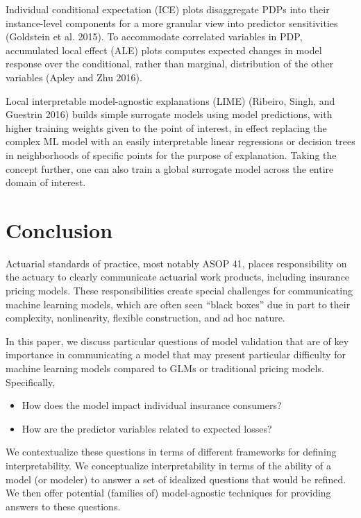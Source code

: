 \documentclass[preprint, 3p, twocolumn, letterpaper, 10pt]{elsarticle} %
\providecommand{\tightlist}{%
  \setlength{\itemsep}{0pt}\setlength{\parskip}{0pt}}
\begin{document}
Individual conditional expectation (ICE) plots disaggregate PDPs into their
instance-level components for a more granular view into predictor sensitivities
(Goldstein et al. 2015). To accommodate correlated variables in PDP, accumulated
local effect (ALE) plots computes expected changes in model response over the
conditional, rather than marginal, distribution of the other variables
(Apley and Zhu 2016).

Local interpretable model-agnostic explanations (LIME) (Ribeiro, Singh, and Guestrin 2016)
builds simple surrogate models using model predictions, with higher training
weights given to the point of interest, in effect replacing the complex ML model
with an easily interpretable linear regressions or decision trees in
neighborhoods of specific points for the purpose of explanation. Taking the
concept further, one can also train a global surrogate model across the entire
domain of interest.

\hypertarget{conclusion}{%
\section{Conclusion}\label{conclusion}}

Actuarial standards of practice, most notably ASOP 41, places responsibility on
the actuary to clearly communicate actuarial work products, including insurance
pricing models. These responsibilities create special challenges for
communicating machine learning models, which are often seen ``black boxes'' due
in part to their complexity, nonlinearity, flexible construction, and ad hoc
nature.

In this paper, we discuss particular questions of model validation that are
of key importance in communicating a model that may present particular
difficulty for machine learning models compared to GLMs or traditional pricing
models. Specifically,

\begin{itemize}
\tightlist
\item
  How does the model impact individual insurance consumers?
\item
  How are the predictor variables related to expected losses?
\end{itemize}

We contextualize these questions in terms of different frameworks for defining
interpretability. We conceptualize interpretability in terms of the ability of
a model (or modeler) to answer a set of idealized questions that would be
refined. We then offer potential (families of) model-agnostic techniques for
providing answers to these questions.
\end{document}

